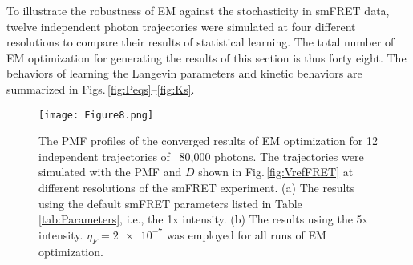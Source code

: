 \documentclass[journal=jpcbfk,manuscript=article,layout=twocolumn,articletitle=true]{achemso}
\begin{document}
To illustrate the robustness of EM against the stochasticity in smFRET data, twelve independent photon trajectories were simulated at four different resolutions to compare their results of statistical learning. The total number of EM optimization for generating the results of this section is thus forty eight. The behaviors of learning the Langevin parameters and kinetic behaviors are summarized in Figs.\,\ref{fig:Peqs}--\ref{fig:Ks}. 

\begin{figure}[ht!]
\centering
\texttt{[image: Figure8.png]}
\caption[Converged PMF from smFRET]{\label{fig:Vs} The PMF profiles of the converged results of EM optimization for 12 independent trajectories of ~80,000 photons. The trajectories were simulated with the PMF and $D$ shown in Fig.\,\ref{fig:VrefFRET} at different resolutions of the smFRET experiment. (a) The results using the default smFRET parameters listed in Table\,\ref{tab:Parameters}, i.e., the 1x intensity. (b) The results using the 5x intensity. $\eta_F=\num{2e-7}$ was employed for all runs of EM optimization.}
\end{figure} 
\end{document}
